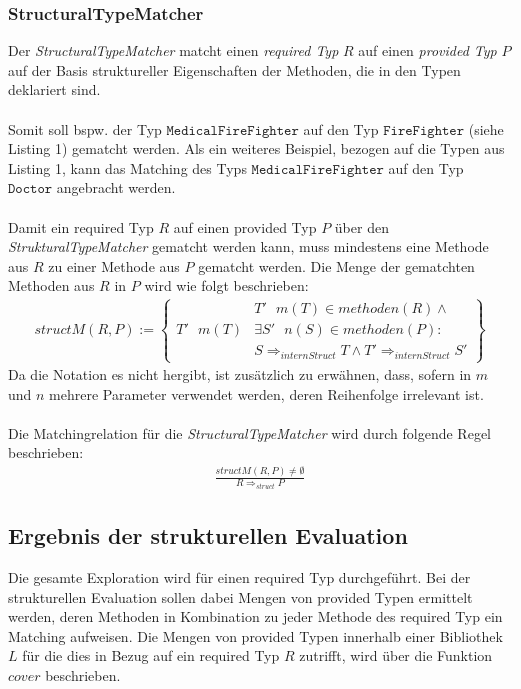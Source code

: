 \subsubsection{StructuralTypeMatcher} 
Der \emph{StructuralTypeMatcher} matcht einen \emph{required Typ} $R$ auf einen \emph{provided Typ} $P$ auf der Basis struktureller Eigenschaften der Methoden, die in den Typen deklariert sind. 
\\\\
Somit soll bspw. der Typ $\texttt{MedicalFireFighter}$ auf den Typ $\texttt{FireFighter}$ (siehe Listing 1) gematcht werden. Als ein weiteres Beispiel, bezogen auf die Typen aus Listing 1, kann das Matching des Typs $\texttt{MedicalFireFighter}$ auf den Typ $\texttt{Doctor}$ angebracht werden.
\\\\
Damit ein required Typ $R$ auf einen provided Typ $P$ über den \emph{StrukturalTypeMatcher} gematcht werden kann, muss mindestens eine Methode aus $R$ zu einer Methode aus $P$ gematcht werden. Die Menge der gematchten Methoden aus $R$ in $P$ wird wie folgt beschrieben:
\begin{gather*}
structM(R,P) := \left\{ 
				\begin{array}{l|l}
				& \mathit{T'\text{ }m(T)} \in \mathit{methoden(R)} \wedge \mathit{ }\\
T'\text{ }m(T)	& \exists \mathit{S'\text{ }n(S)} \in \mathit{methoden(P)} :\\								 				&  S\Rightarrow_{internStruct}T \wedge T' \Rightarrow_{internStruct}S' 
				\end{array}
              \right\}
\end{gather*}
Da die Notation es nicht hergibt, ist zusätzlich zu erwähnen, dass, sofern in $m$ und $n$ mehrere Parameter verwendet werden, deren Reihenfolge irrelevant ist.\\\\
Die Matchingrelation für die \emph{StructuralTypeMatcher} wird durch folgende Regel beschrieben:
\begin{gather*}
\frac{structM(R,P) \neq \emptyset}{R \Rightarrow_{struct}P}
\end{gather*}


\subsection{Ergebnis der strukturellen Evaluation}
Die gesamte Exploration wird für einen required Typ durchgeführt. Bei der strukturellen Evaluation sollen dabei Mengen von provided Typen ermittelt werden, deren Methoden in Kombination zu jeder Methode des required Typ ein Matching aufweisen. Die Mengen von provided Typen innerhalb einer Bibliothek $L$ für die dies in Bezug auf ein required Typ $R$ zutrifft, wird über die Funktion $cover$ beschrieben.

